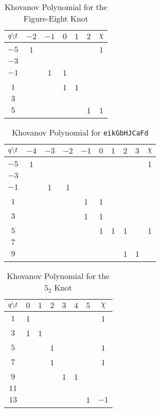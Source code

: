 \begin{table}
    \centering
    \begin{tabular}{| c | c | c | c | c | c | c |}
        \hline
        $q\symbol{92}t$&$-2$&$-1$&$0$&$1$&$2$&$\chi$\\
        \hline
        $-5$&1&&&&&1\\
        \hline
        $-3$&&&&&&\\
        \hline
        $-1$&&1&1&&&\\
        \hline
        $1$&&&1&1&&\\
        \hline
        $3$&&&&&&\\
        \hline
        $5$&&&&&1&1\\
        \hline
    \end{tabular}
    \caption{Khovanov Polynomial for the Figure-Eight Knot}
    \label{table:m_2_kho}
\end{table}
\begin{table}
    \centering
    \begin{tabular}{| c | c | c | c | c | c | c | c | c | c |}
        \hline
        $q\symbol{92}t$&$-4$&$-3$&$-2$&$-1$&$0$&$1$&$2$&$3$&$\chi$\\
        \hline
        $-5$&1&&&&&&&&1\\
        \hline
        $-3$&&&&&&&&&\\
        \hline
        $-1$&&1&1&&&&&&\\
        \hline
        $1$&&&&1&1&&&&\\
        \hline
        $3$&&&&1&1&&&&\\
        \hline
        $5$&&&&&1&1&1&&1\\
        \hline
        $7$&&&&&&&&&\\
        \hline
        $9$&&&&&&&1&1&\\
        \hline
    \end{tabular}
    \caption{Khovanov Polynomial for \texttt{eikGbHJCaFd}}
    \label{table:eikGbHJCaFd_kho}
\end{table}
\begin{table}
    \centering
    \begin{tabular}{| c | c | c | c | c | c | c | c |}
        \hline
        $q\symbol{92}t$&$0$&$1$&$2$&$3$&$4$&$5$&$\chi$\\
        \hline
        $1$&1&&&&&&1\\
        \hline
        $3$&1&1&&&&&\\
        \hline
        $5$&&&1&&&&1\\
        \hline
        $7$&&&1&&&&1\\
        \hline
        $9$&&&&1&1&&\\
        \hline
        $11$&&&&&&&\\
        \hline
        $13$&&&&&&1&$-1$\\
        \hline
    \end{tabular}
    \caption{Khovanov Polynomial for the $5_{2}$ Knot}
    \label{table:m_3_kho}
\end{table}
